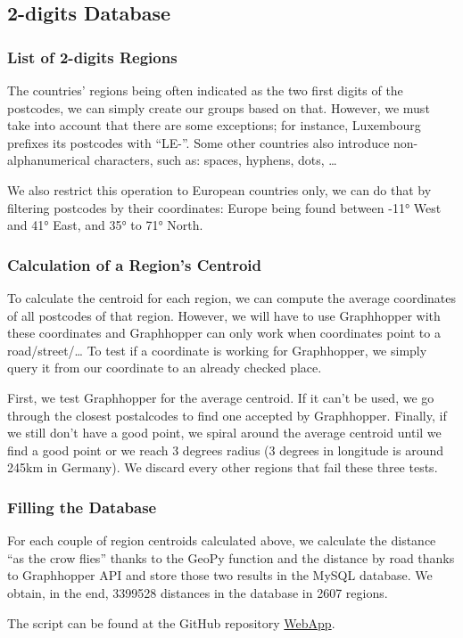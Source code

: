 \subsection{2-digits Database}

\subsubsection{List of 2-digits Regions}

The countries' regions being often indicated as the two first digits of the
postcodes, we can simply create our groups based on that.
However, we must take into account that there are some exceptions; for instance,
Luxembourg prefixes its postcodes with ``LE-''.
Some other countries also introduce non-alphanumerical characters, such as:
spaces, hyphens, dots, \ldots{}

We also restrict this operation to European countries only, we can do that by filtering
postcodes by their coordinates: Europe being found between -11° West and 41° East,
and 35° to 71° North.

\subsubsection{Calculation of a Region's Centroid}

To calculate the centroid for each region, we can compute the average coordinates
of all postcodes of that region. However, we will have to use Graphhopper with
these coordinates and Graphhopper can only work when coordinates point to a
road/street/\ldots{}
To test if a coordinate is working for Graphhopper, we simply query it from our
coordinate to an already checked place.

First, we test Graphhopper for the average centroid. If it can't be used, we go
through the closest postalcodes to find one accepted by Graphhopper. Finally, if
we still don't have a good point, we spiral around the average centroid until we
find a good point or we reach 3 degrees radius (3 degrees in longitude is around
245km in Germany). We discard every other regions that fail these three tests.

\subsubsection{Filling the Database}

For each couple of region centroids calculated above, we calculate the distance
``as the crow flies'' thanks to the GeoPy function and the distance by road thanks
to Graphhopper API and store those two results in the MySQL database.
We obtain, in the end, 3399528 distances in the database in 2607 regions.

The script can be found at the GitHub repository \href{https://github.com/dataBikeHsUlm/WebApp/blob/master/fill_db_with_distances_2digits.py}{WebApp}.
